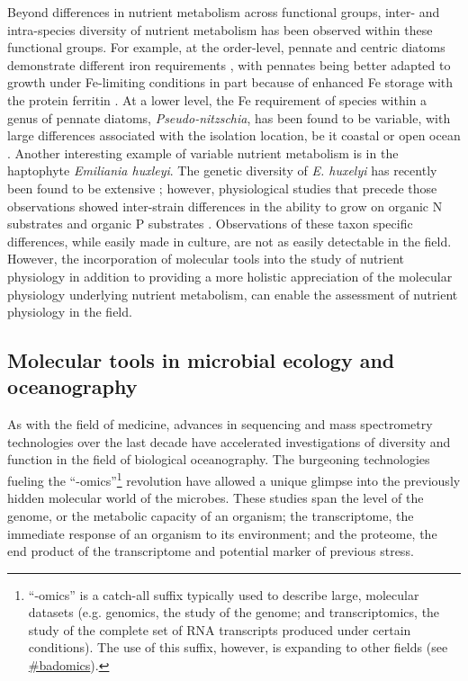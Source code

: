 Beyond differences in nutrient metabolism across functional groups, inter- and intra-species diversity of nutrient metabolism has been observed within these functional groups. For example, at the order-level, pennate and centric diatoms demonstrate different iron requirements \citep{Marchetti2006}, with pennates being better adapted to growth under Fe-limiting conditions in part because of enhanced Fe storage with the protein ferritin \citep{Marchetti2009a}. At a lower level, the Fe requirement of species within a genus of pennate diatoms, \textit{Pseudo-nitzschia}, has been found to be variable, with large differences associated with the isolation location, be it coastal or open ocean \citep{Marchetti2006}. Another interesting example of variable nutrient metabolism is in the haptophyte \textit{Emiliania huxleyi}. The genetic diversity of \textit{E. huxelyi} has recently been found to be extensive \citep{Read2013}; however, physiological studies that precede those observations showed inter-strain differences in the ability to grow on organic N substrates \citep{Strom2009} and organic P substrates \citep{Dyhrman2003}. Observations of these taxon specific differences, while easily made in culture, are not as easily detectable in the field. However, the incorporation of molecular tools into the study of nutrient physiology in addition to providing a more holistic appreciation of the molecular physiology underlying nutrient metabolism, can enable the assessment of nutrient physiology in the field.  

\subsection{Molecular tools in microbial ecology and oceanography}

As with the field of medicine, advances in sequencing and mass spectrometry technologies over the last decade have accelerated investigations of diversity and function in the field of biological oceanography. The burgeoning technologies fueling the ``-omics''\footnote{``-omics'' is a catch-all suffix typically used to describe large, molecular datasets (e.g. genomics, the study of the genome; and transcriptomics, the study of the complete set of RNA transcripts produced under certain conditions). The use of this suffix, however, is expanding to other fields (see \href{https://twitter.com/search?q=\%23badomics&src=typd&lang=en}{\#badomics}).} revolution have allowed a unique glimpse into the previously hidden molecular world of the microbes. These studies span the level of the genome, or the metabolic capacity of an organism; the transcriptome, the immediate response of an organism to its environment; and the proteome, the end product of the transcriptome and potential marker of previous stress.  \par

